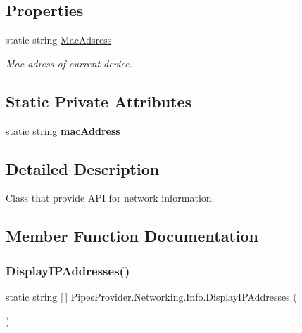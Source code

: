 \subsection*{Properties}
\begin{DoxyCompactItemize}
\item 
static string \mbox{\hyperlink{class_pipes_provider_1_1_networking_1_1_info_a1f52d4e0fadf66135920386cd23473a2}{Mac\+Adsress}}
\begin{DoxyCompactList}\small\item\em Mac adress of current device. \end{DoxyCompactList}\end{DoxyCompactItemize}
\subsection*{Static Private Attributes}
\begin{DoxyCompactItemize}
\item 
\mbox{\label{class_pipes_provider_1_1_networking_1_1_info_a062b88b246e6ed088146325e62fe7d06}} 
static string {\bfseries mac\+Address}
\end{DoxyCompactItemize}


\subsection{Detailed Description}
Class that provide A\+PI for network information. 



\subsection{Member Function Documentation}
\mbox{\label{class_pipes_provider_1_1_networking_1_1_info_ac8097e6a6bccbeae15e309ce72dbac91}} 
\subsubsection{\texorpdfstring{Display\+I\+P\+Addresses()}{DisplayIPAddresses()}}
{\footnotesize\ttfamily static string \mbox{[}$\,$\mbox{]} Pipes\+Provider.\+Networking.\+Info.\+Display\+I\+P\+Addresses (\begin{DoxyParamCaption}{ }\end{DoxyParamCaption})\hspace{0.3cm}{\ttfamily [static]}}



